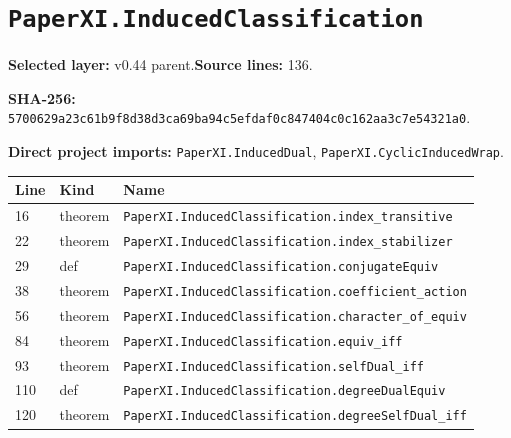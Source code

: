 \documentclass[10pt,oneside]{book}
\begin{document}
\section{\texorpdfstring{\nolinkurl{PaperXI.InducedClassification}}{PaperXI.InducedClassification}}\label{module:PaperXI.InducedClassification}

\textbf{Selected layer:} v0.44 parent.\quad\textbf{Source lines:} 136.\par\textbf{SHA-256:} {\scriptsize\nolinkurl{5700629a23c61b9f8d38d3ca69ba94c5efdaf0c847404c0c162aa3c7e54321a0}}.


\textbf{Direct project imports:} \nolinkurl{PaperXI.InducedDual}, \nolinkurl{PaperXI.CyclicInducedWrap}.

\begin{longtable}{@{}p{}p{}p{}@{}}\toprule Line&Kind&Name\\\midrule\endhead

16&theorem&\nolinkurl{PaperXI.InducedClassification.index_transitive}\\

22&theorem&\nolinkurl{PaperXI.InducedClassification.index_stabilizer}\\

29&def&\nolinkurl{PaperXI.InducedClassification.conjugateEquiv}\\

38&theorem&\nolinkurl{PaperXI.InducedClassification.coefficient_action}\\

56&theorem&\nolinkurl{PaperXI.InducedClassification.character_of_equiv}\\

84&theorem&\nolinkurl{PaperXI.InducedClassification.equiv_iff}\\

93&theorem&\nolinkurl{PaperXI.InducedClassification.selfDual_iff}\\

110&def&\nolinkurl{PaperXI.InducedClassification.degreeDualEquiv}\\

120&theorem&\nolinkurl{PaperXI.InducedClassification.degreeSelfDual_iff}\\

\bottomrule\end{longtable}
\end{document}
